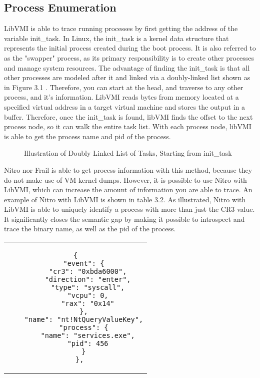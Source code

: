 \documentclass{report}
\begin{document}
\begin{spacing}{1.5}
\subsection{Process Enumeration}

{\large
LibVMI is able to trace running processes by first getting the address of the variable init\_task. In Linux, the init\_task is a kernel data structure that represents the initial process created during the boot process. It is also referred to as the "swapper" process, as its primary responsibility is to create other processes and manage system resources. The advantage of finding the init\_task is that all
other processes are modeled after it and linked via a doubly-linked list shown as in Figure 3.1 \cite{xiong2012libvmi}. Therefore, you can start at the head, and traverse to any other process, and it's information. LibVMI reads bytes from memory located at a specified virtual address in a target virtual machine and stores the output in a buffer. Therefore, once the init\_task is found, libVMI finds the offset to the next process node, so it can walk the entire task list. With each process node, libVMI is able to get the process 
name and pid of the process. 
\newline
}


\begin{figure}[ht]
\centering
  \caption{Illustration of Doubly Linked List of Tasks, Starting from init\_task}
\end{figure}


{\large
\noindent Nitro nor Frail is able to get process information with this method, because they do not make use of VM kernel dumps. However, it is possible to use Nitro with LibVMI, which can increase the amount of information you are able to trace. An example of Nitro with LibVMI is shown in table 3.2. As illustrated, Nitro with LibVMI is able to uniquely identify a process with more than just the CR3 value. It significantly closes the semantic gap by making it possible to introspect and trace the binary name, as well as the pid of the process.
\leavevmode\newline
}
\newpage





\begin{center}
\begin{tabular}{c}
\begin{lstlisting}[caption={}, frame=none]
  {
    "event": {
      "cr3": "0xbda6000",
      "direction": "enter",
      "type": "syscall",
      "vcpu": 0,
      "rax": "0x14"
    },
    "name": "nt!NtQueryValueKey",
    "process": {
      "name": "services.exe",
      "pid": 456
    }
  },
\end{lstlisting}
\end{tabular}
\end{center}








\end{spacing}
\end{document}
